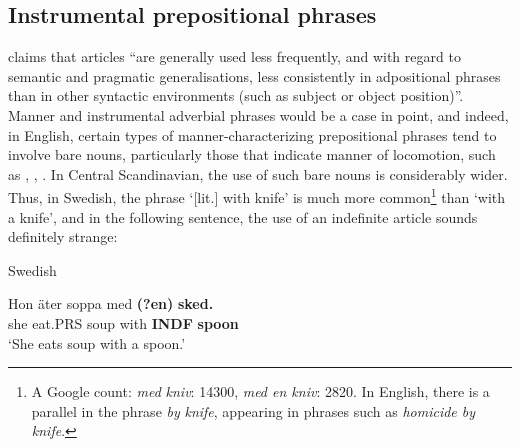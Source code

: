 
\subsection{\rmfamily Instrumental prepositional phrases }

\citet{Himmelmann1998} claims that articles “are generally used less frequently, and with regard to semantic and pragmatic generalisations, less consistently in adpositional phrases than in other syntactic environments (such as subject or object position)”. Manner and instrumental adverbial phrases would be a case in point, and indeed, in English, certain types of manner-characterizing prepositional phrases tend to involve bare nouns, particularly those that indicate manner of locomotion, such as , , . In Central Scandinavian, the use of such bare nouns is considerably wider. Thus, in Swedish, the phrase  ‘[lit.] with knife’ is much more common\footnote{ A Google count: \textit{med}\textit{ }\textit{kniv}: 14300, \textit{med en kniv}: 2820. In English, there is a parallel in the phrase \textit{by} \textit{knife}, appearing in phrases such as \textit{homicide by knife}.} than ‘with a knife’, and in the following sentence, the use of an indefinite article sounds definitely strange:


\item 

\label{bkm:Ref224115033}Swedish



 \ea\label{}
\gll Hon  äter  soppa  med  \textbf{(?en)}\textbf{  sked.}\\


she  eat.PRS  soup  with  \textbf{INDF} \textbf{spoon}\\

\glt ‘She eats soup with a spoon.’

